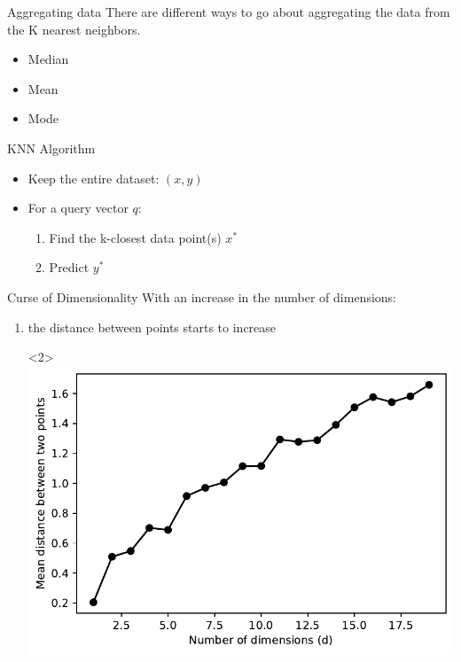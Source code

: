 \documentclass[usenames,dvipsnames]{beamer}
\begin{document}
\begin{frame}{Aggregating data}
	There are different ways to go about aggregating the data from the K nearest neighbors.
	
	
	\begin{itemize}
		\item Median
		\item Mean
		\item Mode
	\end{itemize}
\end{frame}
\begin{frame}{KNN Algorithm}
\begin{itemize}
\item<1-> Keep the entire dataset: ${(x,y)}$
\item<2-> For a query vector $q$:
\begin{enumerate}
\item<3-> Find the k-closest data point(s) $x^*$
\item<4-> Predict $y^*$
\end{enumerate}
\end{itemize}
\end{frame}

\begin{frame}{Curse of Dimensionality}
With an increase in the number of dimensions:
\begin{enumerate}
\item<2-> the distance between points starts to increase
\item[]<2> {\centering \includegraphics[height=0.6\textheight]{knn/curse_dist.pdf}}
\end{enumerate}
\end{frame}
\end{document}
